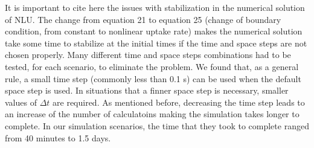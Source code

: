 %
%
%
%
%
%
%
%
%

It is important to cite here the issues with stabilization in the numerical solution of NLU.
The change from equation 21 to equation 25 (change of boundary condition, from constant to nonlinear uptake rate) makes the numerical solution take some time to stabilize at the initial times if the time and space steps are not chosen properly. 
Many different time and space steps combinations had to be tested, for each scenario, to eliminate the problem. 
We found that, as a general rule, a small time step (commonly less than 0.1 s) can be used when the default space step is used. 
In situations that a finner space step is necessary, smaller values of $\Delta t$ are required. 
As mentioned before, decreasing the time step leads to an increase of the number of calculatoins making the simulation takes longer to complete. 
In our simulation scenarios, the time that they took to complete ranged from 40 minutes to 1.5 days.


